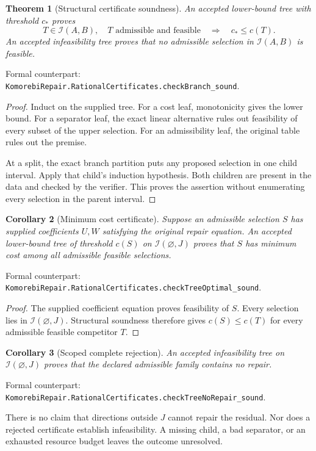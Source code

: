\documentclass[11pt,letterpaper,oneside,openany]{book}
\theoremstyle{quiet}
\newtheorem{theorem}{Theorem}[chapter]
\newtheorem{corollary}[theorem]{Corollary}
\newcommand{\formal}[1]{\par\nobreak\begingroup\footnotesize\color{Slate}\sffamily Formal counterpart: \normalfont\nolinkurl{#1}.\par\endgroup}
\begin{document}
\begin{theorem}[Structural certificate soundness]
An accepted lower-bound tree with threshold $c_\ast$ proves
\[
 T\in\mathcal I(A,B),\quad T\text{ admissible and feasible}
 \quad\Longrightarrow\quad c_\ast\leq c(T).
\]
An accepted infeasibility tree proves that no admissible selection in $\mathcal I(A,B)$ is feasible.
\end{theorem}
\formal{KomorebiRepair.RationalCertificates.checkBranch_sound}

\begin{proof}
Induct on the supplied tree. For a cost leaf, monotonicity gives the lower bound. For a separator leaf, the exact linear alternative rules out feasibility of every subset of the upper selection. For an admissibility leaf, the original table rules out the premise.

At a split, the exact branch partition puts any proposed selection in one child interval. Apply that child's induction hypothesis. Both children are present in the data and checked by the verifier. This proves the assertion without enumerating every selection in the parent interval.
\end{proof}

\begin{corollary}[Minimum cost certificate]
Suppose an admissible selection $S$ has supplied coefficients $U,W$ satisfying the original repair equation. An accepted lower-bound tree of threshold $c(S)$ on $\mathcal I(\varnothing,J)$ proves that $S$ has minimum cost among all admissible feasible selections.
\end{corollary}
\formal{KomorebiRepair.RationalCertificates.checkTreeOptimal_sound}
\begin{proof}
The supplied coefficient equation proves feasibility of $S$. Every selection lies in $\mathcal I(\varnothing,J)$. Structural soundness therefore gives $c(S)\leq c(T)$ for every admissible feasible competitor $T$.
\end{proof}

\begin{corollary}[Scoped complete rejection]
An accepted infeasibility tree on $\mathcal I(\varnothing,J)$ proves that the declared admissible family contains no repair.
\end{corollary}
\formal{KomorebiRepair.RationalCertificates.checkTreeNoRepair_sound}

There is no claim that directions outside $J$ cannot repair the residual. Nor does a rejected certificate establish infeasibility. A missing child, a bad separator, or an exhausted resource budget leaves the outcome unresolved.
\end{document}
